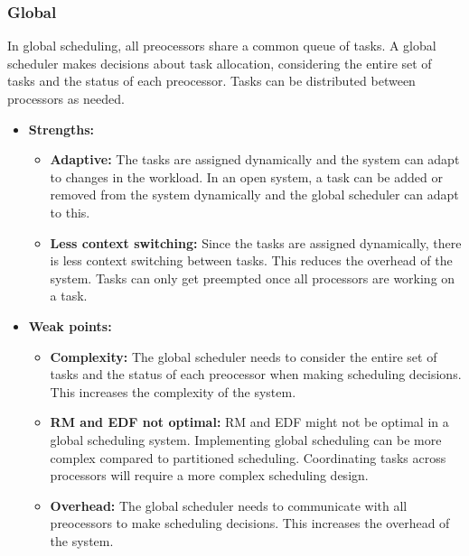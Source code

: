         \subsubsection*{\textbf{Global}}
        In global scheduling, all preocessors share a common queue of tasks. A global scheduler makes decisions about task allocation, considering the entire set of tasks and the status of each preocessor. Tasks can be distributed between processors as needed.
        \begin{itemize}
            \item \textbf{Strengths:}
            \begin{itemize}
                \item \textbf{Adaptive:} The tasks are assigned dynamically and the system can adapt to changes in the workload. In an open system, a task can be added or removed from the system dynamically and the global scheduler can adapt to this.
                \item \textbf{Less context switching:} Since the tasks are assigned dynamically, there is less context switching between tasks. This reduces the overhead of the system. Tasks can only get preempted once all processors are working on a task.
            \end{itemize}
            \item \textbf{Weak points:}
            \begin{itemize}
                \item \textbf{Complexity:} The global scheduler needs to consider the entire set of tasks and the status of each preocessor when making scheduling decisions. This increases the complexity of the system.
                \item \textbf{RM and EDF not optimal:} RM and EDF might not be optimal in a global scheduling system. Implementing global scheduling can be more complex compared to partitioned scheduling. Coordinating tasks across processors will require a more complex scheduling design.
                \item \textbf{Overhead:} The global scheduler needs to communicate with all preocessors to make scheduling decisions. This increases the overhead of the system.
            \end{itemize}
        \end{itemize}
        
